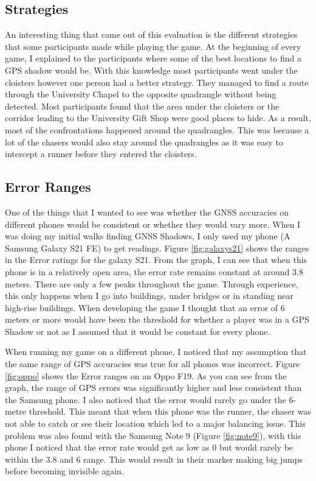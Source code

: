 \documentclass{l4proj}
\begin{document}
\subsection{Strategies}
An interesting thing that came out of this evaluation is the different strategies that some participants made while playing the game. At the beginning
of every game, I explained to the participants where some of the best locations to find a GPS shadow would be. With this knowledge most participants
went under the cloisters however one person had a better strategy. They managed to find a route through the University Chapel to the opposite
quadrangle without being detected. Most participants found that the area under the cloisters or the corridor leading to the University Gift Shop were good places to hide. As a result, most of
the confrontations happened around the quadrangles. This was because a lot of the chasers would also stay around the quadrangles as it was easy to intercept
a runner before they entered the cloisters.

\subsection{Error Ranges}
\label{phase1errorrange}
One of the things that I wanted to see was whether the GNSS accuracies on different phones would be consistent or whether they would vary more.
When I was doing my initial walks finding GNSS Shadows, I only used my phone (A Samsung Galaxy S21 FE) to get readings. Figure \ref{fig:galaxys21}
shows the ranges in the Error ratings for the galaxy S21. From the graph, I can see that when this phone is in a relatively open area, the error rate remains constant at around 3.8 meters. There
are only a few peaks throughout the game. Through experience, this only happens when I go into buildings, under bridges or in standing near high-rise buildings. 
When developing the game I thought that an error of 6 meters or more would have been the threshold for whether a player was in a GPS Shadow or not as I
assumed that it would be constant for every phone.

When running my game on a different phone, I noticed that my assumption that the same range of GPS accuracies was true for all phones was incorrect. Figure \ref{fig:oppo}
shows the Error ranges on an Oppo F19. As you can see from the graph, the range of GPS errors was significantly higher and less consistent than the Samsung phone. I also
noticed that the error would rarely go under the 6-metre threshold. This meant that when this phone was the runner, the chaser was not able to catch or see their location
which led to a major balancing issue. This problem was also found with the Samsung Note 9 (Figure \ref{fig:note9}), with this phone I noticed that the error rate would get
as low as 0 but would rarely be within the 3.8 and 6 range. This would result in their marker making big jumps before becoming invisible again.
\end{document}
